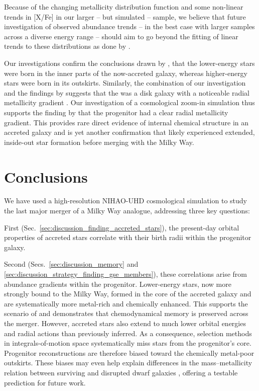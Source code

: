 \documentclass[fleqn,usenatbib]{mnras}
\begin{document}
Because of the changing metallicity distribution function and some non-linear trends in [X/Fe] in our larger -- but simulated -- sample, we believe that future investigation of observed abundance trends -- in the best case with larger samples across a diverse energy range -- should aim to go beyond the fitting of linear trends to these distributions as done by \citet{Skuladottir2025}.

Our investigations confirm the conclusions drawn by \citet{Skuladottir2025}, that the lower-energy stars were born in the inner parts of the now-accreted galaxy, whereas higher-energy stars were born in its outskirts. Similarly, the combination of our investigation and the findings by \citet{Skuladottir2025} suggests that the  was a disk galaxy with a noticeable radial metallicity gradient%
. Our investigation of a cosmological zoom-in simulation thus supports the finding by \citet{Skuladottir2025} that the  progenitor had a clear radial metallicity gradient. This provides rare direct evidence of internal chemical structure in an accreted galaxy and is yet another confirmation that  likely experienced extended, inside-out star formation before merging with the Milky Way.

\section{Conclusions}
\label{sec:conclusions}

We have used a high-resolution NIHAO-UHD cosmological simulation to study the last major merger of a Milky Way analogue, addressing three key questions:

First (Sec.~\ref{sec:discussion_finding_accreted_stars}), the present-day orbital properties of accreted stars correlate with their birth radii within the progenitor galaxy.

Second (Secs.~\ref{sec:discussion_memory} and \ref{sec:discussion_strategy_finding_gse_members}), these correlations arise from abundance gradients within the progenitor. Lower-energy stars, now more strongly bound to the Milky Way, formed in the core of the accreted galaxy and are systematically more metal-rich and chemically enhanced. This supports the scenario of \citet{Skuladottir2025} and demonstrates that chemodynamical memory is preserved across the merger. However, accreted stars also extend to much lower orbital energies and radial actions than previously inferred. As a consequence, selection methods in integrals-of-motion space \citep{Helmi2018, Feuillet2021, Monty2024} systematically miss stars from the progenitor’s core. Progenitor reconstructions are therefore biased toward the chemically metal-poor outskirts. These biases may even help explain differences in the mass–metallicity relation between surviving and disrupted dwarf galaxies \citep{Naidu2022}, offering a testable prediction for future work.
\end{document}
